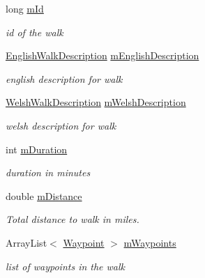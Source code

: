 \begin{DoxyCompactItemize}
\item 
long \hyperlink{classuk_1_1ac_1_1swan_1_1digitaltrails_1_1components_1_1_walk_a3f58853b9e42a36f131e04efcfafd63f}{m\+Id}
\begin{DoxyCompactList}\small\item\em id of the walk \end{DoxyCompactList}\item 
\hyperlink{classuk_1_1ac_1_1swan_1_1digitaltrails_1_1components_1_1_english_walk_description}{English\+Walk\+Description} \hyperlink{classuk_1_1ac_1_1swan_1_1digitaltrails_1_1components_1_1_walk_a4279b72210d6b6b62fda226a9d1bdbbb}{m\+English\+Description}
\begin{DoxyCompactList}\small\item\em english description for walk \end{DoxyCompactList}\item 
\hyperlink{classuk_1_1ac_1_1swan_1_1digitaltrails_1_1components_1_1_welsh_walk_description}{Welsh\+Walk\+Description} \hyperlink{classuk_1_1ac_1_1swan_1_1digitaltrails_1_1components_1_1_walk_a660b99698c634b548f4bbee778c36d33}{m\+Welsh\+Description}
\begin{DoxyCompactList}\small\item\em welsh description for walk \end{DoxyCompactList}\item 
int \hyperlink{classuk_1_1ac_1_1swan_1_1digitaltrails_1_1components_1_1_walk_ad883348dd2fc478737c0efc880af0363}{m\+Duration}
\begin{DoxyCompactList}\small\item\em duration in minutes \end{DoxyCompactList}\item 
double \hyperlink{classuk_1_1ac_1_1swan_1_1digitaltrails_1_1components_1_1_walk_ae9d7a2acfca54e3d73177d4c7678728b}{m\+Distance}
\begin{DoxyCompactList}\small\item\em Total distance to walk in miles. \end{DoxyCompactList}\item 
Array\+List$<$ \hyperlink{classuk_1_1ac_1_1swan_1_1digitaltrails_1_1components_1_1_waypoint}{Waypoint} $>$ \hyperlink{classuk_1_1ac_1_1swan_1_1digitaltrails_1_1components_1_1_walk_a47504a4f93ca4091881314da0d29929d}{m\+Waypoints}
\begin{DoxyCompactList}\small\item\em list of waypoints in the walk \end{DoxyCompactList}\item 

\end{DoxyCompactItemize}
